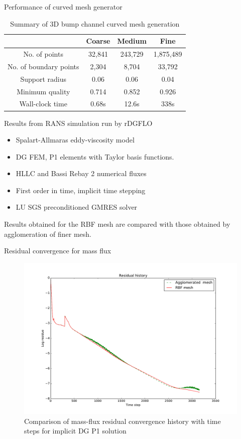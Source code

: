 \documentclass[t,12pt]{beamer}
\begin{document}
\begin{frame}{Performance of curved mesh generator}
	\begin{table}
		\centering
		\begin{tabular}{|c|c|c|c|}
			\hline
			& Coarse & Medium & Fine \\
			\hline
			No. of points 				& 32,841 & 243,729	& 1,875,489 \\
			No. of boundary points		& 2,304	& 8,704		& 33,792 \\
			Support radius				& 0.06	& 0.06		& 0.04 \\
			Minimum quality			& 0.714	& 0.852		& 0.926 \\
			Wall-clock time			& 0.68s	& 12.6s		& 338s \\
			\hline
		\end{tabular}
		\caption{Summary of 3D bump channel curved mesh generation}
	\end{table}
\end{frame}

\begin{frame}
Results from RANS simulation run by rDGFLO 
\begin{itemize}
	\item Spalart-Allmaras eddy-viscosity model
	\item DG FEM, P1 elements with Taylor basis functions.
	\item HLLC and Bassi Rebay 2 numerical fluxes
	\item First order in time, implicit time stepping
	\item LU SGS preconditioned GMRES solver
\end{itemize}
Results obtained for the RBF mesh are compared with those obtained by agglomeration of finer mesh.
\end{frame}

\begin{frame}{Residual convergence for mass flux}
\begin{figure}
	\centering
	\includegraphics[scale=0.27]{solver-convergence}
	\caption{Comparison of mass-flux residual convergence history with time steps for implicit DG P1 solution}
	\label{fig:resconvergence}
\end{figure}
\end{frame}
\end{document}
